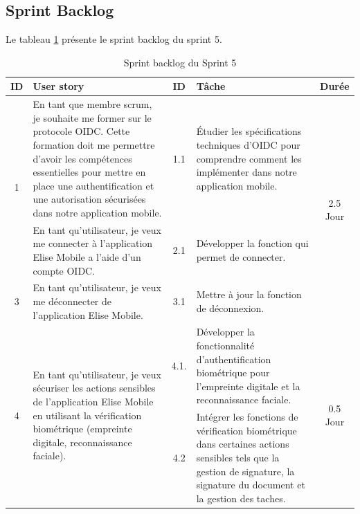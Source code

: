 \subsection{Sprint Backlog}

Le tableau \ref{tab:sprint-backlog-5} présente le sprint backlog du sprint 5.

\begin{adjustwidth}{-1cm}{}
    
    \begin{longtable}{|c|p{6cm}|c|p{6cm}|c|}
      \caption{Sprint backlog du Sprint 5} \label{tab:sprint-backlog-5} \\
      \hline
      \textbf{ID} & \textbf{User story} & \textbf{ID}  & \textbf{Tâche} & \textbf{Durée} \\
      \hline
      \multirow{2}{*}{1} & En tant que membre scrum, je souhaite me former sur le protocole OIDC. Cette formation doit me permettre d'avoir les compétences essentielles pour mettre en place une authentification et une autorisation sécurisées dans notre application mobile.
      & 1.1 & Étudier les spécifications techniques d'OIDC pour comprendre comment les implémenter dans notre application mobile. & \multirow{3}{*}{2.5 Jour} \\
      \cline{1-5}
      \multirow{1}{*}{2} & En tant qu'utilisateur, je veux me connecter à l'application Elise Mobile a l'aide d'un compte OIDC. & 2.1 & Développer la fonction qui permet de connecter. &  \multirow{1}{*}{2.5 Jour} \\
      \cline{1-5}
      \multirow{1}{*}{3} & En tant qu'utilisateur, je veux me déconnecter de l'application Elise Mobile. & 3.1 & Mettre à jour la fonction de déconnexion. & \multirow{1}{*}{0.5 Jour} \\
      \cline{1-5}
      \multirow{2}{*}{4} & \multirow{2}{6cm}{En tant qu'utilisateur, je veux sécuriser les actions sensibles de l'application Elise Mobile en utilisant la vérification biométrique (empreinte digitale, reconnaissance faciale).} & 4.1.& Développer la fonctionnalité d'authentification biométrique pour l'empreinte digitale et la reconnaissance faciale. & \multirow{2}{*}{0.5 Jour} \\
      \cline{3-4}
      & & 4.2 & Intégrer les fonctions de vérification biométrique dans certaines actions sensibles tels que la gestion de signature, la signature du document et la gestion des taches. & \\
      \cline{1-5}
  \hline

\end{longtable}
\end{adjustwidth}


